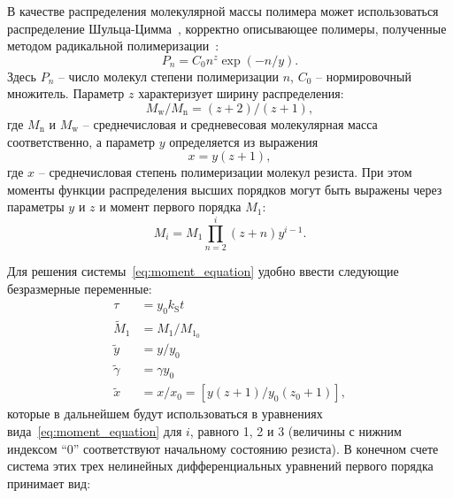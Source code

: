 В качестве распределения молекулярной массы полимера может использоваться распределение Шульца-Цимма~\cite{Boyd_3, Schulz-Zimm_distribution}, корректно описывающее полимеры, полученные методом радикальной полимеризации~\cite{Schulz-Zimm_distribution_proof}:
\begin{equation} \label{eq:Schulz-Zimm_distribution}
	P_n = C_0 n^z \exp (-n/y).
\end{equation}
Здесь $P_n$ -- число молекул степени полимеризации $n$, $C_0$ -- нормировочный множитель. Параметр $z$ характеризует ширину распределения:
\begin{equation} \label{eq:Schulz-Zimm_1}
	M_\mathrm{w} / M_\mathrm{n} = (z+2) /(z+1),
\end{equation}
где $M_\mathrm{n}$ и $M_\mathrm{w}$ -- среднечисловая и средневесовая молекулярная масса соответственно, а параметр $y$ определяется из выражения
\begin{equation} \label{eq:Schulz-Zimm_2}
	x = y(z+1),
\end{equation}
где $x$ -- среднечисловая степень полимеризации молекул резиста. При этом моменты функции распределения высших порядков могут быть выражены через параметры $y$ и $z$ и момент первого порядка $M_1$:
\begin{equation}
	M_i=M_1 \prod_{n=2}^i(z+n) y^{i-1}.
\end{equation}

Для решения системы~\ref{eq:moment_equation} удобно ввести следующие безразмерные переменные:
\begin{equation} \label{eq:dim_less_MW}
	\begin{aligned}
		\tau & = y_0 k_\mathrm{S} t \\
		\tilde{M}_1 & = M_1 / M_{1_0} \\
		\tilde{y} & = y / y_0 \\
		\tilde{\gamma} & = \gamma y_0 \\
		\tilde{x} & = x / x_0 = \left[y(z+1) / y_0\left(z_0+1\right)\right],
	\end{aligned}
\end{equation}
которые в дальнейшем будут использоваться в уравнениях вида~\ref{eq:moment_equation} для $i$, равного 1, 2 и 3 (величины с нижним индексом ``0'' соответствуют начальному состоянию резиста). В конечном счете система этих трех нелинейных дифференциальных уравнений первого порядка принимает вид:

